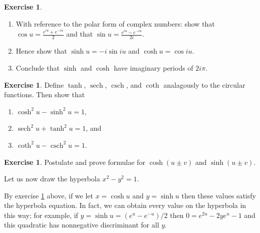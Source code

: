 \documentclass[a4paper,leqno]{article}
\numberwithin{equation}{section}
\theoremstyle{definition}
\newtheorem{exercise}[equation]{Exercise}
\theoremstyle{remark}
\DeclareMathOperator{\sech}{sech}
\DeclareMathOperator{\csch}{csch}
\begin{document}
\begin{exercise}\leavevmode
  \begin{enumerate}
    \item With reference to the polar form of complex numbers: show that $ \cos u = \frac{e^{iu} + e^{-iu}}{2} $ and
          that $ \sin u = \frac{e^{iu} - e^{-iu}}{2i} $.
    \item Hence show that $ \sinh u = -i \sin iu $ and $ \cosh u = \cos iu $.
    \item Conclude that $ \sinh $ and $ \cosh $ have imaginary periods of $ 2i\pi $.
  \end{enumerate}
\end{exercise}

\begin{exercise}\label{ex:hyperidentities}
  Define $ \tanh $, $ \sech $, $ \csch $, and $ \coth $ analagously to the circular functions. Then show that
  \begin{enumerate}
    \item $ \cosh^2 u - \sinh^2 u = 1 $,
    \item $ \sech^2 u + \tanh^2 u = 1 $, and
    \item $ \coth^2 u - \csch^2 u = 1 $.
  \end{enumerate}
\end{exercise}

\begin{exercise}
  Postulate and prove formulae for $ \cosh(u \pm v) $ and $ \sinh(u \pm v) $.
\end{exercise}

Let us now draw the hyperbola $ x^2 - y^2 = 1 $.
\begin{center}
\end{center}

By exercise \ref{ex:hyperidentities} above, if we let $ x = \cosh u $ and $ y = \sinh u $ then these
values satisfy the hyperbola equation. In fact, we can obtain every value on the hyperbola in this way;
for example, if $ y = \sinh u = (e^u - e^{-u})/2 $ then $ 0 = e^{2u} - 2ye^u - 1 $ and this quadratic
has nonnegative discriminant for all $ y $.
\end{document}
